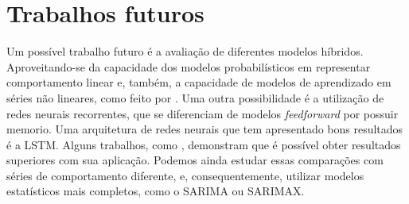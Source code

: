 \documentclass[
    12pt,
    oneside,
    a4paper,
    english,
    brazil
]{abntex2}
\begin{document}
\section{Trabalhos futuros}

Um  possível trabalho  futuro é  a  avaliação de  diferentes modelos  híbridos.
Aproveitando-se  da  capacidade   dos  modelos  probabilísticos  em  representar
comportamento linear e, também, a capacidade  de modelos de aprendizado em séries
não  lineares, como  feito por  . Uma  outra
possibilidade é a  utilização de redes neurais recorrentes,  que se diferenciam
de modelos \textit{feedforward}  por possuir memorio. Uma  arquitetura de redes
neurais  que  tem  apresentado  bons  resultados é  a  LSTM.  Alguns  trabalhos,
como  ,  demonstram   que  é  possível
obter  resultados superiores  com sua  aplicação. Podemos  ainda estudar  essas
comparações com séries de  comportamento diferente, e, consequentemente, utilizar
modelos estatísticos mais completos, como o SARIMA ou SARIMAX\@.

\postextual


\end{document}
